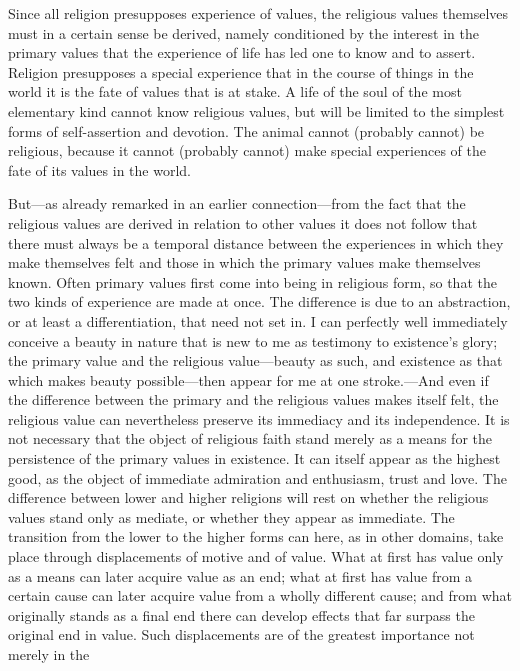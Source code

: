\documentclass[12pt,a4paper]{book}
\newcommand{\opage}[1]{\marginnote{\footnotesize\textit{[#1]}}}
\begin{document}
Since all religion presupposes experience of values, the religious values themselves must in a certain
sense be derived, namely conditioned by the interest in the primary values that the experience of life
has led one to know and to assert. Religion presupposes a special experience that in the course of
things in the world it is the fate of values that is at stake. A life of the soul of the most elementary
kind cannot know religious values, but will be limited to the simplest forms of self-assertion and
devotion. The animal cannot (probably cannot) be religious, because it cannot (probably cannot) make
special experiences of the fate of its values in the world.

But---as already remarked in an earlier connection---from the fact 
\opage{148}that the religious values are derived
in relation to other values it does not follow that there must always be a temporal distance between the
experiences in which they make themselves felt and those in which the primary values make themselves
known. Often primary values first come into being in religious form, so that the two kinds of experience
are made at once. The difference is due to an abstraction, or at least a differentiation, that need not
set in. I can perfectly well immediately conceive a beauty in nature that is new to me as testimony to
existence's glory; the primary value and the religious value---beauty as such, and existence as that
which makes beauty possible---then appear for me at one stroke.---And even if the difference between the
primary and the religious values makes itself felt, the religious value can nevertheless preserve its
immediacy and its independence. It is not necessary that the object of religious faith stand merely as a
means for the persistence of the primary values in existence. It can itself appear as the highest good,
as the object of immediate admiration and enthusiasm, trust and love. The difference between lower and
higher religions will rest on whether the religious values stand only as mediate, or whether they appear
as immediate. The transition from the lower to the higher forms can here, as in other domains, take place
through displacements of motive and of value. What at first has value only as a means can later acquire
value as an end; what at first has value from a certain cause can later acquire value from a wholly
different cause; and from what originally stands as a final end there can develop effects that far
surpass the original end in value. Such displacements are of the greatest importance not merely in the
\end{document}
